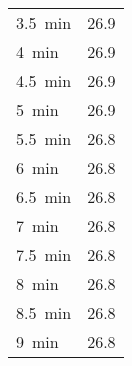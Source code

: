 \documentclass[11pt, titlepage]{article}
\begin{document}
\begin{center}
\begin{minipage}[t]{2in}
\begin{tabular}{l c}
                    \SI{3.5}{\minute} & 26.9 \\
                    \SI{4}{\minute} & 26.9 \\
                    \SI{4.5}{\minute} & 26.9 \\
                    \SI{5}{\minute} & 26.9 \\
                    \SI{5.5}{\minute} & 26.8 \\
                    \SI{6}{\minute} & 26.8 \\
                    \SI{6.5}{\minute} & 26.8 \\
                    \SI{7}{\minute} & 26.8 \\
                    \SI{7.5}{\minute} & 26.8 \\
                    \SI{8}{\minute} & 26.8 \\
                    \SI{8.5}{\minute} & 26.8 \\
                    \SI{9}{\minute} & 26.8 \\
                    \bottomrule
                \end{tabular}
            \end{minipage}
        \end{center}
    \nocite{manual}
    \printbibliography
\end{document}

